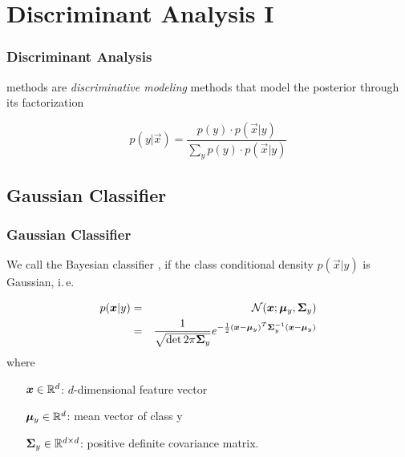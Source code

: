 \section{Discriminant Analysis I}

\begin{frame}
  \frametitle{Discriminant Analysis}

   methods are \emph{discriminative modeling} methods that model the posterior through its factorization 
  
  \begin{displaymath}
    p(y|\vec x) = \frac{p(y)\cdot p(\vec x|y)}{\sum_y p(y)\cdot p(\vec x|y)}
  \end{displaymath}
\end{frame}


\subsection{Gaussian Classifier}

\begin{frame}
  \frametitle{Gaussian Classifier}

  We call the Bayesian classifier , if the class conditional density $p(\vec x|y)$ is Gaussian, i.\,e.

  \begin{eqnarray*}
     p({\bm x} | y) &=& \mathcal {N} ({\bm x} ;{\bm \mu}_y, {\bm \Sigma}_y) \\
                   &=& \frac{1}{\sqrt{\det 2\pi  {\bm \Sigma}_y}} 
                       e^{-\frac{1}{2}({\bm x} -{\bm \mu}_y)^T {\bm \Sigma}_y^{-1}({\bm x} - {\bm \mu}_y)}
  \end{eqnarray*}
%
  where
%
  \begin{center}
    \begin{minipage}{0.6\textwidth}
      \begin{itemize}
        \item[${\bm x} \in \mathbb{R}^d$:] $d$-dimensional feature vector\\
        \item[${\bm \mu}_y \in \mathbb{R}^d $:] mean vector of class y\\
        \item[$ {\bm \Sigma}_y \in \mathbb{R}^{d\times d}$:] positive definite covariance matrix.
      \end{itemize}
    \end{minipage}
  \end{center}
\end{frame}


